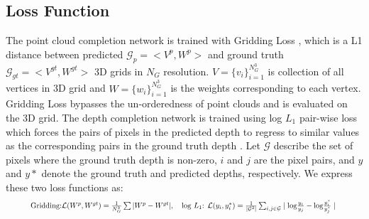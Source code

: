 \documentclass{article}
\begin{document}
\subsection{Loss Function}
The point cloud completion network is trained with Gridding Loss \citep{GRNet}, which is a L1 distance between predicted $\mathcal{G}_{p} = <V^{p}, W^{p}>$ and ground truth $\mathcal{G}_{gt} = <V^{gt}, W^{gt}>$ 3D grids in $N_G$ resolution. $V=\{v_i\}^{N_G^3}_{i=1}$ is collection of all vertices in 3D grid and $W=\{w_i\}^{N_G^3}_{i=1}$ is the weights corresponding to each vertex. Gridding Loss bypasses the un-orderedness of point clouds and is evaluated on the 3D grid. The depth completion network is trained using log $L_1$ pair-wise loss which forces the pairs of pixels in the predicted depth to regress to similar values as the corresponding pairs in the ground truth depth \citep{dmidc2020}. Let $\mathcal{G}$ describe the set of pixels where the ground truth depth is non-zero, $i$ and $j$ are the pixel pairs, and $y$ and $y*$ denote the ground truth and predicted depths, respectively.  We express these two loss functions as:
\begin{equation}
\resizebox{0.9\textwidth}{!}{$
\textrm{Gridding:} \mathcal{L}( W^{p},  W^{gt}) = \frac{1}{N^3_G} \sum| W^{p} -  W^{gt}|,  \quad \textrm{log } L_1 \textrm{: }\mathcal{L}(y_i,y_i^*) = \frac{1}{| \mathcal{G}^2 |} \sum_{i,j \in \mathcal{G}} \mid \text{log} \frac{y_i}{y_j} - \text{log} \frac{y_i^*}{y_j^*} \mid $
}
\end{equation}
\end{document}
